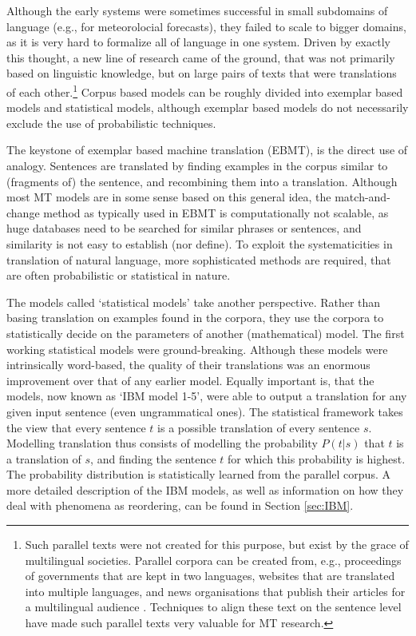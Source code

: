 Although the early systems were sometimes successful in small subdomains of language (e.g., \cite{chandioux1976meteo} for meteorolocial forecasts), they failed to scale to bigger domains, as it is very hard to formalize all of language in one system. Driven by exactly this thought, a new line of research came of the ground, that was not primarily based on linguistic knowledge, but on large pairs of texts that were translations of each other.\footnote{Such parallel texts were not created for this purpose, but exist by the grace of multilingual societies. Parallel corpora can be created from, e.g., proceedings of governments that are kept in two languages, websites that are translated into multiple languages, and news organisations that publish their articles for a multilingual audience \citep{koehn2008statistical}. Techniques to align these text on the sentence level \citep[e.g.,][]{varga2007parallel} have made such parallel texts very valuable for MT research.} Corpus based models can be roughly divided into exemplar based models and statistical models, although exemplar based models do not necessarily exclude the use of probabilistic techniques.

The keystone of exemplar based machine translation (EBMT), is the direct use of analogy. Sentences are translated by finding examples in the corpus similar to (fragments of) the sentence, and recombining them into a translation. Although most MT models are in some sense based on this general idea, the match-and-change method as typically used in EBMT is computationally not scalable, as huge databases need to be searched for similar phrases or sentences, and similarity is not easy to establish (nor define). To exploit the systematicities in translation of natural language, more sophisticated methods are required, that are often probabilistic or statistical in nature.


The models called `statistical models' take another perspective. Rather than basing translation on examples found in the corpora, they use the corpora to statistically decide on the parameters of another (mathematical) model. The first working statistical models \citep{brown1988statistical,brown1990statistical,brown1993mathematics} were ground-breaking. Although these models were intrinsically word-based, the quality of their translations was an enormous improvement over that of any earlier model. Equally important is, that the models, now known as `IBM model 1-5', were able to output a translation for any given input sentence (even ungrammatical ones). The statistical framework takes the view that every sentence $t$ is a possible translation of every sentence $s$. Modelling translation thus consists of modelling the probability $P(t|s)$ that $t$ is a translation of $s$, and finding the sentence $t$ for which this probability is highest. The probability distribution is statistically learned from the parallel corpus. A more detailed description of the IBM models, as well as information on how they deal with phenomena as reordering, can be found in Section \ref{sec:IBM}.

